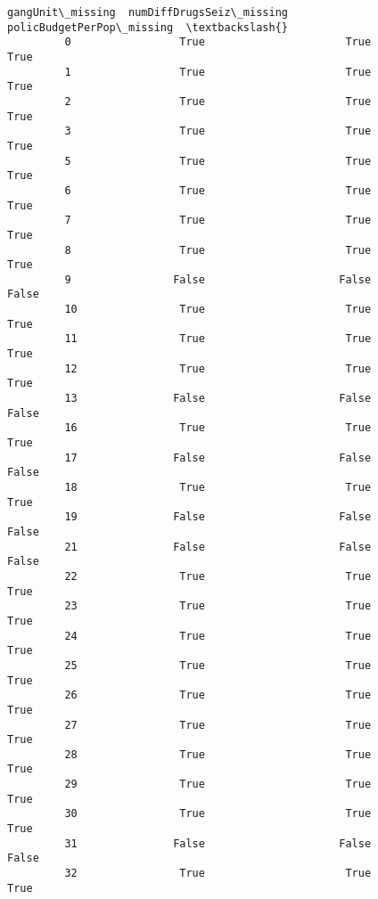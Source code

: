 \documentclass[11pt]{llncs}
\begin{document}
\begin{Verbatim}[commandchars=\\\{\}]
               gangUnit\_missing  numDiffDrugsSeiz\_missing  policBudgetPerPop\_missing  \textbackslash{}
         0                 True                      True                       True   
         1                 True                      True                       True   
         2                 True                      True                       True   
         3                 True                      True                       True   
         5                 True                      True                       True   
         6                 True                      True                       True   
         7                 True                      True                       True   
         8                 True                      True                       True   
         9                False                     False                      False   
         10                True                      True                       True   
         11                True                      True                       True   
         12                True                      True                       True   
         13               False                     False                      False   
         16                True                      True                       True   
         17               False                     False                      False   
         18                True                      True                       True   
         19               False                     False                      False   
         21               False                     False                      False   
         22                True                      True                       True   
         23                True                      True                       True   
         24                True                      True                       True   
         25                True                      True                       True   
         26                True                      True                       True   
         27                True                      True                       True   
         28                True                      True                       True   
         29                True                      True                       True   
         30                True                      True                       True   
         31               False                     False                      False   
         32                True                      True                       True   

\end{Verbatim}
\end{document}
